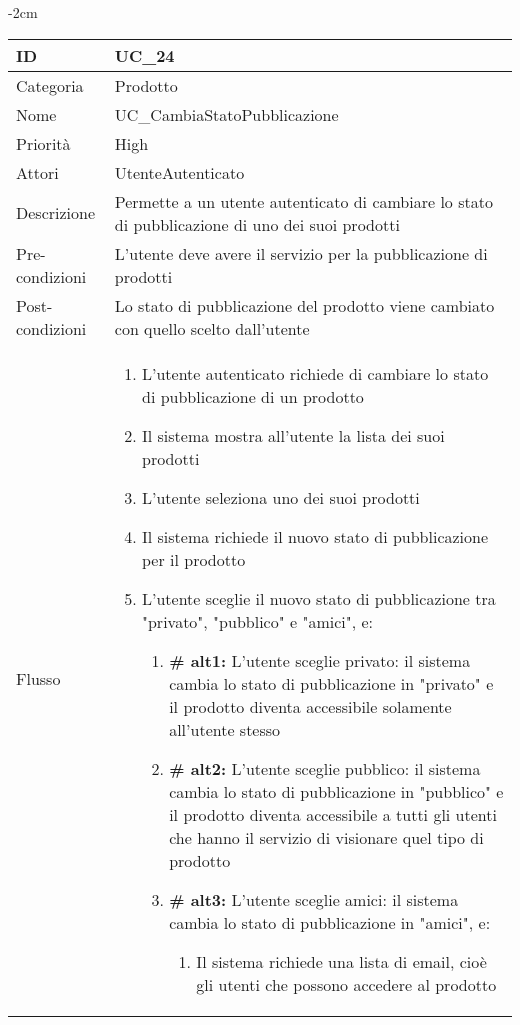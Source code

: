 \begin{center}
\begin{table}[bp]
    \centering
    \addtolength{\leftskip} {-2cm}
\begin{tabular}{ |p{2.6cm}|p{13cm}|  }
\hline
ID & UC\_24\\\hline
Categoria & Prodotto \\\hline
Nome & UC\_CambiaStatoPubblicazione \\\hline
Priorità & High \\\hline
Attori &  UtenteAutenticato \\\hline
Descrizione & Permette a un utente autenticato di cambiare lo stato di pubblicazione di uno dei suoi prodotti\\\hline
Pre-condizioni &  L'utente deve avere il servizio per la pubblicazione di prodotti\\\hline
Post-condizioni &  Lo stato di pubblicazione del prodotto viene cambiato con quello scelto dall'utente\\\hline
Flusso &  	\vspace{-5mm} \begin{enumerate}
			\item L'utente autenticato richiede di cambiare lo stato di pubblicazione di un prodotto
			\item Il sistema mostra all'utente la lista dei suoi prodotti
			\item L'utente seleziona uno dei suoi prodotti
			\item Il sistema richiede il nuovo stato di pubblicazione per il prodotto
			\item L'utente sceglie il nuovo stato di pubblicazione tra "privato", "pubblico" e "amici", e:
				\begin{enumerate}[  ]
					\item \textbf{\# alt1:} L'utente sceglie privato: il sistema cambia lo stato di pubblicazione in "privato" e il prodotto diventa accessibile solamente all'utente stesso
					\item \textbf{\# alt2:} L'utente sceglie pubblico: il sistema cambia lo stato di pubblicazione in "pubblico" e il prodotto diventa accessibile a tutti gli utenti che hanno il servizio di visionare quel tipo di prodotto
					\item \textbf{\# alt3:} L'utente sceglie amici: il sistema cambia lo stato di pubblicazione in "amici", e:
					\begin{enumerate}[label*=\arabic*.]
						\item Il sistema richiede una lista di email, cioè gli utenti che possono accedere al prodotto

\end{enumerate}
\end{enumerate}
\end{enumerate}
\end{tabular}
\end{table}
\end{center}
